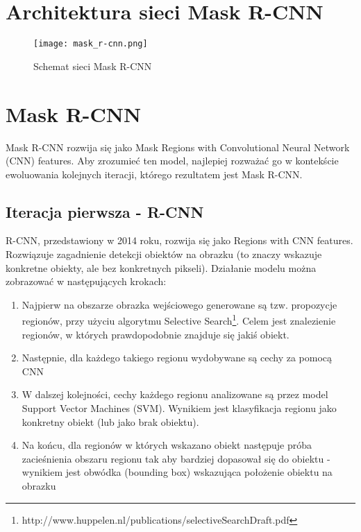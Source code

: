 \section{Architektura sieci Mask R-CNN}

\begin{figure}[H]
  \centering
  \caption{Schemat sieci Mask R-CNN}
  \texttt{[image: mask\_r-cnn.png]}
\end{figure}

\section{Mask R-CNN}

Mask R-CNN rozwija się jako Mask Regions with Convolutional Neural Network (CNN) features. Aby zrozumieć ten model, najlepiej rozważać go w kontekście ewoluowania kolejnych iteracji, którego rezultatem jest Mask R-CNN.

\subsection{Iteracja pierwsza - R-CNN}

R-CNN, przedstawiony w 2014 roku, rozwija się jako Regions with CNN features. Rozwiązuje zagadnienie detekcji obiektów na obrazku (to znaczy wskazuje konkretne obiekty, ale bez konkretnych pikseli). Działanie modelu można zobrazować w następujących krokach:

\begin{enumerate}
	\item Najpierw na obszarze obrazka wejściowego generowane są tzw. propozycje regionów, przy użyciu algorytmu Selective Search\footnote{http://www.huppelen.nl/publications/selectiveSearchDraft.pdf}. Celem jest znalezienie regionów, w których prawdopodobnie znajduje się jakiś obiekt.
	\item Następnie, dla każdego takiego regionu wydobywane są cechy za pomocą CNN
	\item W dalszej kolejności, cechy każdego regionu analizowane są przez model Support Vector Machines (SVM). Wynikiem jest klasyfikacja regionu jako konkretny obiekt (lub jako brak obiektu).
	\item Na końcu, dla regionów w których wskazano obiekt następuje próba zacieśnienia obszaru regionu tak aby bardziej dopasował się do obiektu - wynikiem jest obwódka (bounding box) wskazująca położenie obiektu na obrazku
\end{enumerate}


